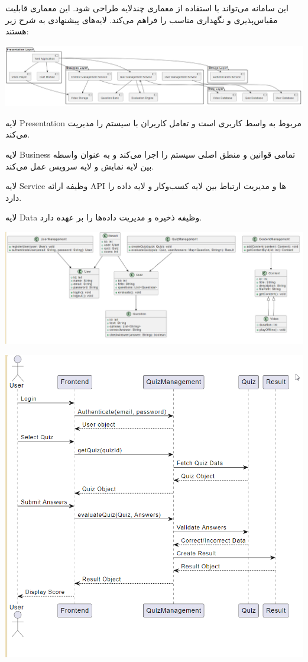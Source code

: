 این سامانه می‌تواند با استفاده از معماری چندلایه طراحی شود. این معماری قابلیت مقیاس‌پذیری و نگهداری مناسب را فراهم می‌کند. لایه‌های پیشنهادی به شرح زیر هستند:


	\includegraphics[width=1\linewidth]{screenshot001}


لایه Presentation مربوط به واسط کاربری است و تعامل کاربران با سیستم را مدیریت می‌کند.
 
لایه Business تمامی قوانین و منطق اصلی سیستم را اجرا می‌کند و به عنوان واسطه بین لایه نمایش و لایه سرویس عمل می‌کند.

لایه Service وظیفه ارائه API‌ ها و مدیریت ارتباط بین لایه کسب‌وکار و لایه داده را دارد. 

لایه Data وظیفه ذخیره و مدیریت داده‌ها را بر عهده دارد.



	\includegraphics[width=1\linewidth]{screenshot002}



	\includegraphics[width=0.5\linewidth]{screenshot003}
